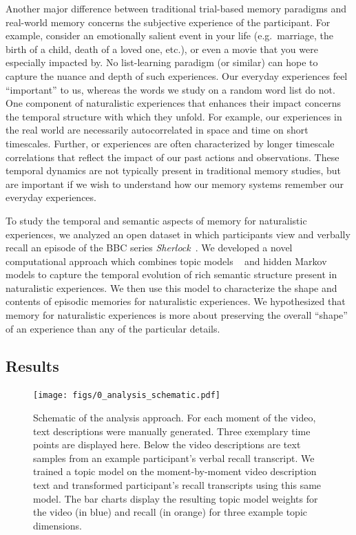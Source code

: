 \documentclass{article}
\begin{document}
{Another major difference between traditional trial-based memory paradigms and real-world memory concerns the subjective experience of the participant.  For example, consider an emotionally salient event in your life (e.g.\ marriage, the birth of a child, death of a loved one, etc.), or even a movie that you were especially impacted by.  No list-learning paradigm (or similar) can hope to capture the nuance and depth of such experiences.  Our everyday experiences feel ``important'' to us, whereas the words we study on a random word list do not.  One component of naturalistic experiences that enhances their impact concerns the temporal structure with which they unfold.  For example, our experiences in the real world are necessarily autocorrelated in space and time on short timescales.  Further, or experiences are often characterized by longer timescale correlations that reflect the impact of our past actions and observations.  These temporal dynamics are not typically present in traditional memory studies, but are important if we wish to understand how our memory systems remember our everyday experiences.

To study the temporal and semantic aspects of memory for naturalistic experiences, we analyzed an open dataset in which participants view and verbally recall an episode of the BBC series \textit{Sherlock}~\citep{ChenEtal17}.  We developed a novel computational approach which combines topic models ~\cite{Blei03} and hidden Markov models to capture the temporal evolution of rich semantic structure present in naturalistic experiences. We then use this model to characterize the shape and contents of episodic memories for naturalistic experiences. We hypothesized that memory for naturalistic experiences is more about preserving the overall ``shape'' of an experience than any of the particular details.

\subsection{Results}

\begin{figure}[t!]
\centering
\texttt{[image: figs/0\_analysis\_schematic.pdf]}
\caption{\label{fig:schematic}Schematic of the analysis approach. For each moment of the video, text descriptions were manually generated. Three exemplary time points are displayed here.  Below the video descriptions are text samples from an example participant's verbal recall transcript.  We trained a topic model on the moment-by-moment video description text and transformed participant's recall transcripts using this same model. The bar charts display the resulting topic model weights for the video (in blue) and recall (in orange) for three example topic dimensions.}
\end{figure}

}
\end{document}
